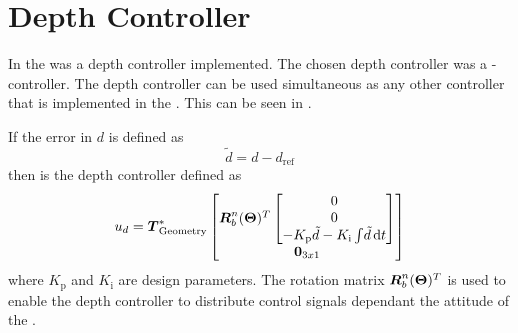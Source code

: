 \section{Depth Controller}  
In the \abbrROV was a depth controller implemented. The chosen depth controller was a \abbrPI-controller. The depth controller can be used simultaneous as any other controller that is implemented in the \abbrROV. This can be seen in .

If the error in $d$ is defined as 
\begin{equation}
\tilde{d} = d - d_{\text{ref}}
\end{equation}
then is the \abbrPI depth controller defined as
\begin{equation}
u_{d} = \thrusterGeometryOnes[*]\begin{bmatrix} \boldsymbol{R}^n_b(\eulerAngles)^T \begin{bmatrix}
0 \\
0 \\
- K_{\text{p}} \tilde{d} - K_{\text{i}}\int \! \tilde{d} \, \mathrm{d}t
\end{bmatrix} \\ \zeroCol{3}\end{bmatrix}
\end{equation}
where $K_{\text{p}}$ and $K_{\text{i}}$ are design parameters. The rotation matrix $\boldsymbol{R}^n_b(\eulerAngles)^T$ is used to enable the depth controller to distribute control signals dependant the attitude of the \abbrROV.

